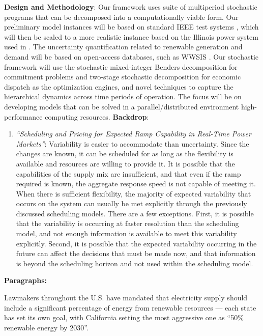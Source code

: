 \documentclass[11pt,a4paper]{article}
\begin{document}
{\bf Design and Methodology}: Our framework uses suite of multiperiod stochastic programs that can be decomposed into a computationally viable form. Our preliminary model instances will be based on standard IEEE test systems \cite{Chri99}, which will then be scaled to a more realistic instance based on the Illinois power system used in \cite{Gang16a}. The uncertainty quantification related to renewable generation and demand will be based on open-access databases, such as WWSIS \cite{Pott08}. Our stochastic framework will use the stochastic mixed-integer Benders decomposition for commitment problems and two-stage stochastic decomposition \cite{Higl94} for economic dispatch as the optimization engines, and novel techniques to capture the hierarchical dynamics across time periods of operation. The focus will be on developing models that can be solved in a parallel/distributed environment high-performance computing resources. 
\newpage
{\bf Backdrop}: 
\begin{enumerate}
\item {\it ``Scheduling and Pricing for Expected Ramp Capability in Real-Time Power Markets''}: Variability is easier to accommodate than uncertainty. Since the changes are known, it can be scheduled for as long as the flexibility is available and resources are willing to provide it. It is possible that the capabilities of the supply mix are insufficient, and that even if the ramp required is known, the aggregate response speed is not capable of meeting it. When there is sufficient flexibility, the majority of expected variability that occurs on the system can usually be met explicitly through the previously discussed scheduling models. There are a few exceptions. First, it is possible that the variability is occurring at faster resolution than the scheduling model, and not enough information is available to meet this variability explicitly. Second, it is possible that the expected variability occurring in the future can affect the decisions that must be made now, and that information is beyond the scheduling horizon and not used within the scheduling model. 
\end{enumerate}

\newpage

{\bf Paragraphs: }

Lawmakers throughout the U.S. have mandated that electricity supply should include a significant percentage of energy from renewable resources --- each state has set its own goal, with California setting the most aggressive one as ``50\% renewable energy by 2030''.  
\end{document}
